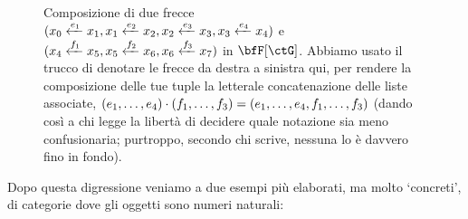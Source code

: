 \begin{example}
\begin{figure}
\begin{center}
  \end{center}
  \caption{Composizione di due frecce \((x_0 \xleftarrow{e_1} x_1, x_1 \xleftarrow{e_2} x_2 ,x_2 \xleftarrow{e_3} x_3, x_3 \xleftarrow{e_4} x_4)\) e \((x_4 \xleftarrow{f_1} x_5,x_5 \xleftarrow{f_2} x_6, x_6 \xleftarrow{f_3} x_7)\) in \(\bfF[\ctG]\). Abbiamo usato il trucco di denotare le frecce da destra a sinistra qui, per rendere la composizione delle tue tuple la letterale concatenazione delle liste associate,
   \((\tup e4,)\cmp (\tup f3,) = (\tup e4,,\tup f3,)\)
   (dando così a chi legge la libertà di decidere quale notazione sia meno confusionaria; purtroppo, secondo chi scrive, nessuna lo è davvero fino in fondo).}
  \label{fig:enter-label}
 \end{figure}
\end{example}
Dopo questa digressione veniamo a due esempi più elaborati, ma molto `concreti', di categorie dove gli oggetti sono numeri naturali:
